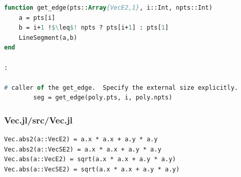 \begin{lstlisting}[caption=Changed code 
,label=list:julia_06_automotive, escapechar=!, language=Pascal, frame=single]
function get_edge(pts::Array{VecE2,1}, i::Int, npts::Int)  
    a = pts[i]
    b = i+1 !$\leq$! npts ? pts[i+1] : pts[1]
    LineSegment(a,b)
end

:

# caller of the get_edge.  Specify the external size explicitly.
        seg = get_edge(poly.pts, i, poly.npts)  

\end{lstlisting}


\subsubsection{Vec.jl/src/Vec.jl}


\begin{lstlisting}[caption=Changed code 
,label=list:julia_06_vec, escapechar=!, language=Pascal, frame=single]
Vec.abs2(a::VecE2) = a.x * a.x + a.y * a.y
Vec.abs2(a::VecSE2) = a.x * a.x + a.y * a.y
Vec.abs(a::VecE2) = sqrt(a.x * a.x + a.y * a.y)
Vec.abs(a::VecSE2) = sqrt(a.x * a.x + a.y * a.y)
\end{lstlisting}

